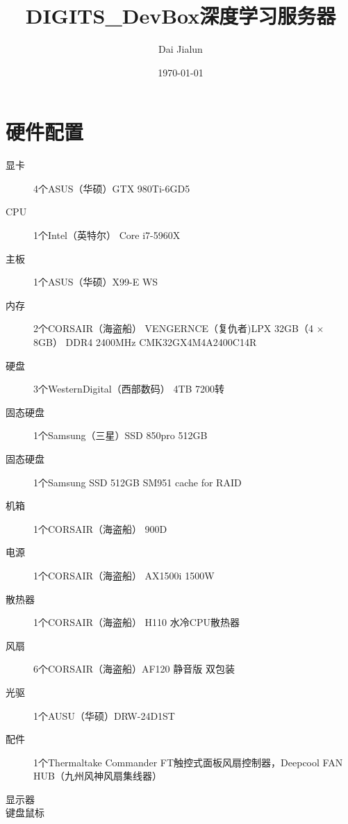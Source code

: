 

\title{\vspace{-2em} DIGITS\_DevBox深度学习服务器\\
\normalsize{}}
\author{Dai Jialun}
\date{\vspace{-0.7em} \today \vspace{-0.7em}}
\maketitle\thispagestyle{fancy}
\maketitle
\section{硬件配置}
\begin{description}
\item[显卡] 4个ASUS（华硕）GTX 980Ti-6GD5
\item[CPU] 1个Intel（英特尔） Core i7-5960X
\item[主板] 1个ASUS（华硕）X99-E WS
\item[内存] 2个CORSAIR（海盗船） VENGERNCE（复仇者)LPX 32GB（4 $\times$ 8GB） DDR4 2400MHz CMK32GX4M4A2400C14R
\item[硬盘] 3个WesternDigital（西部数码） 4TB 7200转
\item[固态硬盘] 1个Samsung（三星）SSD 850pro 512GB
\item[固态硬盘] 1个Samsung SSD 512GB SM951 cache for RAID
\item[机箱] 1个CORSAIR（海盗船） 900D
\item[电源] 1个CORSAIR（海盗船） AX1500i 1500W
\item[散热器] 1个CORSAIR（海盗船） H110 水冷CPU散热器
\item[风扇] 6个CORSAIR（海盗船）AF120 静音版 双包装
\item[光驱] 1个AUSU（华硕）DRW-24D1ST
\item[配件] 1个Thermaltake Commander FT触控式面板风扇控制器，Deepcool FAN HUB（九州风神风扇集线器）
\item[显示器]
\item[键盘鼠标]
\end{description}

